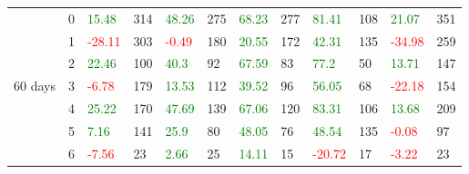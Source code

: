 \begin{table}[!htb]
\begin{adjustwidth}{-0.8in}{-0.9in}
\begin{tabular}{|p{4em}|p{2em}|p{3em}|p{3em}|p{3em}|p{3em}|p{3em}|p{3em}|p{3em}|p{3em}|p{3em}|p{3em}|}
            & 0 & \textcolor{green}{15.48} & 314 & \textcolor{green}{48.26} & 275 & \textcolor{green}{68.23} & 277 & \textcolor{green}{81.41} & 108 & \textcolor{green}{21.07} & 351\\\cline{3-12}
            & 1 & \textcolor{red}{-28.11} & 303 & \textcolor{red}{-0.49} & 180 & \textcolor{green}{20.55} & 172 & \textcolor{green}{42.31} & 135 & \textcolor{red}{-34.98} & 259\\\cline{3-12}
            & 2 & \textcolor{green}{22.46} & 100 & \textcolor{green}{40.3} & 92 & \textcolor{green}{67.59} & 83 & \textcolor{green}{77.2} & 50 & \textcolor{green}{13.71} & 147\\\cline{3-12}
            60 days & 3 & \textcolor{red}{-6.78} & 179 & \textcolor{green}{13.53} & 112 & \textcolor{green}{39.52} & 96 & \textcolor{green}{56.05} & 68 & \textcolor{red}{-22.18} & 154\\\cline{3-12}
            & 4 & \textcolor{green}{25.22} & 170 & \textcolor{green}{47.69} & 139 & \textcolor{green}{67.06} & 120 & \textcolor{green}{83.31} & 106 & \textcolor{green}{13.68} & 209\\\cline{3-12}
            & 5 & \textcolor{green}{7.16} & 141 & \textcolor{green}{25.9} & 80 & \textcolor{green}{48.05} & 76 & \textcolor{green}{48.54} & 135 & \textcolor{red}{-0.08} & 97\\\cline{3-12}
            & 6 & \textcolor{red}{-7.56} & 23 & \textcolor{green}{2.66} & 25 & \textcolor{green}{14.11} & 15 & \textcolor{red}{-20.72} & 17 & \textcolor{red}{-3.22} & 23\\\hline\hline


\end{tabular}
\end{adjustwidth}
\end{table}
